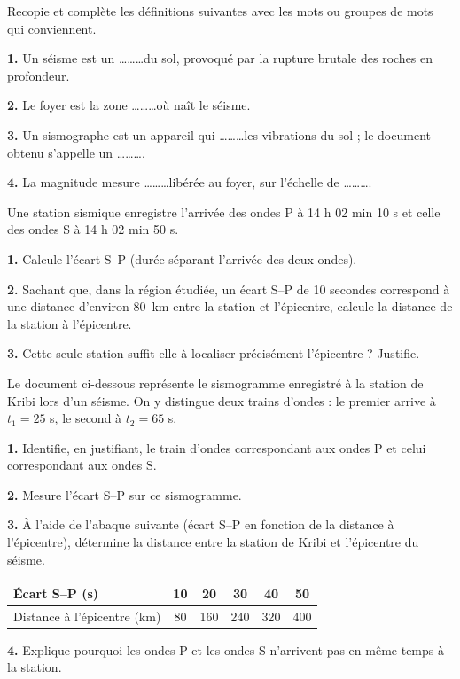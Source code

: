 \documentclass[11pt]{article}
\newcommand{\cle}[1]{{\popxbold\color{popdark}#1}}
\newcounter{popsec}
\newcounter{popsub}
\newcommand{\courssub}[1]{%
  \stepcounter{popsub}%
  \par\vspace{9pt}\noindent{\popxbold\fontsize{11.5}{13}\selectfont\color{popink}{\color{poporange}\thepopsec.\thepopsub}\hspace{6pt}#1}\par\nopagebreak\vspace{4pt}
}
\begin{document}
\begin{exercice}
Recopie et complète les définitions suivantes avec les mots ou groupes de mots qui conviennent.

\textbf{1.} Un \cle{séisme} est un \ldots\ldots\ldots du sol, provoqué par la rupture brutale des roches en profondeur.

\textbf{2.} Le \cle{foyer} est la zone \ldots\ldots\ldots où naît le séisme.

\textbf{3.} Un \cle{sismographe} est un appareil qui \ldots\ldots\ldots les vibrations du sol ; le document obtenu s'appelle un \ldots\ldots\ldots .

\textbf{4.} La \cle{magnitude} mesure \ldots\ldots\ldots libérée au foyer, sur l'échelle de \ldots\ldots\ldots .
\end{exercice}

\begin{exercice}
Une station sismique enregistre l'arrivée des ondes P à 14 h 02 min 10 s et celle des ondes S à 14 h 02 min 50 s.

\textbf{1.} Calcule l'écart S--P (durée séparant l'arrivée des deux ondes).

\textbf{2.} Sachant que, dans la région étudiée, un écart S--P de 10 secondes correspond à une distance d'environ \SI{80}{km} entre la station et l'épicentre, calcule la distance de la station à l'épicentre.

\textbf{3.} Cette seule station suffit-elle à localiser précisément l'épicentre ? Justifie.
\end{exercice}

\courssub{Je m'entraîne}

\begin{exercice}
Le document ci-dessous représente le sismogramme enregistré à la station de Kribi lors d'un séisme. On y distingue deux trains d'ondes : le premier arrive à $t_1 = 25$ s, le second à $t_2 = 65$ s.

\textbf{1.} Identifie, en justifiant, le train d'ondes correspondant aux ondes P et celui correspondant aux ondes S.

\textbf{2.} Mesure l'écart S--P sur ce sismogramme.

\textbf{3.} À l'aide de l'abaque suivante (écart S--P en fonction de la distance à l'épicentre), détermine la distance entre la station de Kribi et l'épicentre du séisme.

\begin{center}
\begin{tabular}{|l|c|c|c|c|c|}
\hline
\rowcolor{popblueL} Écart S--P (s) & 10 & 20 & 30 & 40 & 50 \\
\hline
Distance à l'épicentre (km) & 80 & 160 & 240 & 320 & 400 \\
\hline
\end{tabular}
\end{center}

\textbf{4.} Explique pourquoi les ondes P et les ondes S n'arrivent pas en même temps à la station.
\end{exercice}
\end{document}
